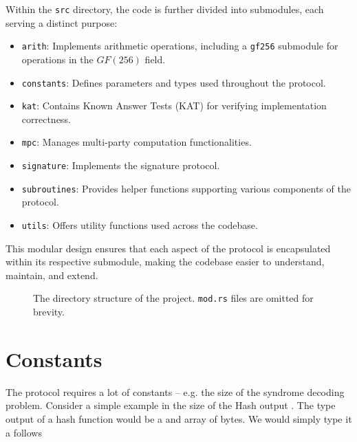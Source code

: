\documentclass[11pt]{report}
\theoremstyle{definition}
\theoremstyle{plain}
\begin{document}
Within the \texttt{src} directory, the code is further divided into submodules, each serving a distinct purpose:

\begin{itemize}
  \item \texttt{arith}: Implements arithmetic operations, including a \texttt{gf256} submodule for operations in the $GF(256)$ field.
  \item \texttt{constants}: Defines parameters and types used throughout the protocol.
  \item \texttt{kat}: Contains Known Answer Tests (KAT) for verifying implementation correctness.
  \item \texttt{mpc}: Manages multi-party computation functionalities.
  \item \texttt{signature}: Implements the signature protocol.
  \item \texttt{subroutines}: Provides helper functions supporting various components of the protocol.
  \item \texttt{utils}: Offers utility functions used across the codebase.
\end{itemize}

This modular design ensures that each aspect of the protocol is encapsulated within its respective submodule, making the codebase easier to understand, maintain, and extend.
\begin{figure}[H]
  \caption{The directory structure of the project. \texttt{mod.rs} files are omitted for brevity.}
  \label{fig:structure}
\end{figure}

\section{Constants}\label{sub:constants}
The protocol requires a lot of constants -- e.g. the size of the syndrome decoding problem. Consider a simple example in the size of the Hash output . The type output of a hash function would be a and array of bytes. We would simply type it a follows
\end{document}
